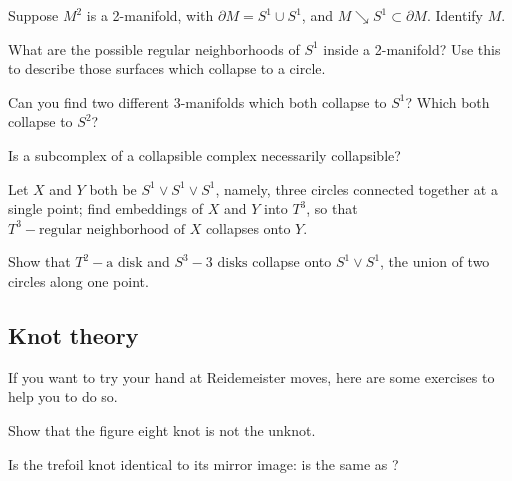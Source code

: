 \documentclass[12pt]{pset}
\newcommand{\collapses}{\searrow}
\begin{document}
\begin{problem}
 Suppose $M^2$ is a 2-manifold, with $\partial M = S^1 \cup S^1$, and
 $M \collapses S^1 \subset \partial M$.  Identify $M$.
\end{problem}

\begin{requiredproblem}
  What are the possible regular neighborhoods of $S^1$ inside a
  2-manifold?  Use this to describe those surfaces which collapse to a circle.
\end{requiredproblem}

\begin{problem}
  Can you find two different 3-manifolds which both collapse to $S^1$?
  Which both collapse to $S^2$?
\end{problem}

\begin{requiredproblem}
 Is a subcomplex of a collapsible complex necessarily collapsible?
\end{requiredproblem}

\begin{problem}
  Let $X$ and $Y$ both be $S^1 \vee S^1 \vee S^1$, namely, three
  circles connected together at a single point; find embeddings of $X$
  and $Y$ into $T^3$, so that $T^3 - \mbox{regular neighborhood of
    $X$}$ collapses onto $Y$.
\end{problem}

\begin{requiredproblem}
  Show that $T^2 - \mbox{a disk}$ and $S^3 - \mbox{3 disks}$ collapse
  onto $S^1 \vee S^1$, the union of two circles along one point.
\end{requiredproblem}

\pagebreak
\subsection*{Knot theory}

If you want to try your hand at Reidemeister moves, here are some exercises
to help you to do so.

\begin{problem}
  Show that the figure eight knot 
     is not the unknot.
\end{problem}

\begin{problem}
 Is the trefoil knot identical to its mirror image: is
  the same as
  ?
\end{problem}
\end{document}
